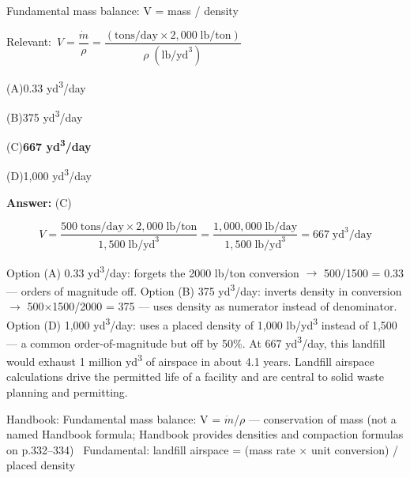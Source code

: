 \documentclass[11pt]{article}
\newcommand{\correct}[1]{\textbf{#1}\;{\color{accent}$\checkmark$}}
\newcommand{\optline}[2]{\par\noindent\hspace{1.2em}(#1)\hspace{0.6em}#2}
\begin{document}
Fundamental mass balance: V = mass / density\par\vspace{3pt}
{\small\color{soft}Relevant:}\ $V = \dfrac{\dot{m}}{\rho} = \dfrac{(\text{tons/day}\times 2{,}000\;\text{lb/ton})}{\rho\;(\text{lb/yd}^3)}$\par\vspace{3pt}
\optline{A}{0.33 yd\textsuperscript{3}/day}
\optline{B}{375 yd\textsuperscript{3}/day}
\optline{C}{\correct{667 yd\textsuperscript{3}/day}}
\optline{D}{1,000 yd\textsuperscript{3}/day}
\par\vspace{3pt}
\vspace{2pt}\par\noindent\colorbox{boxbg}{\parbox{\dimexpr\linewidth-2\fboxsep\relax}{%
\vspace{2pt}\textbf{Answer:} (C)\par\vspace{2pt}
{\small \[V = \frac{500\;\text{tons/day} \times 2{,}000\;\text{lb/ton}}{1{,}500\;\text{lb/yd}^3} = \frac{1{,}000{,}000\;\text{lb/day}}{1{,}500\;\text{lb/yd}^3} = 667\;\text{yd}^3\text{/day}\]

Option (A) 0.33 yd\textsuperscript{3}/day: forgets the 2000 lb/ton conversion $\rightarrow$ 500/1500 = 0.33 --- orders of magnitude off. Option (B) 375 yd\textsuperscript{3}/day: inverts density in conversion $\rightarrow$ 500$\times$1500/2000 = 375 --- uses density as numerator instead of denominator. Option (D) 1,000 yd\textsuperscript{3}/day: uses a placed density of 1,000 lb/yd\textsuperscript{3} instead of 1,500 --- a common order-of-magnitude but off by 50\%. At 667 yd\textsuperscript{3}/day, this landfill would exhaust 1 million yd\textsuperscript{3} of airspace in about 4.1 years. Landfill airspace calculations drive the permitted life of a facility and are central to solid waste planning and permitting.}\par\vspace{2pt}
{\footnotesize\color{soft}Handbook: Fundamental mass balance: V = $\dot{m}$/$\rho$ --- conservation of mass (not a named Handbook formula; Handbook provides densities and compaction formulas on p.332--334) \textbullet\ Fundamental: landfill airspace = (mass rate $\times$ unit conversion) / placed density}\vspace{2pt}
}}
\vspace{9pt}
\end{document}
